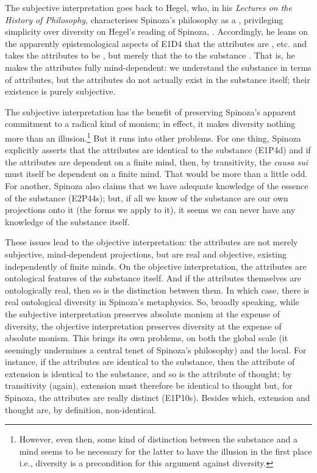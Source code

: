 \documentclass[11pt]{article}
\newcommand{\dash}{\unskip{---}}
\newcommand\foreign[2]{\foreignlanguage{#1}{\emph{#2}}}
\newcommand\texttitle[1]{\emph{#1}}
\newcommand\simplecite[1]{(#1)}
\begin{document}
	The subjective interpretation goes back to Hegel, who, in his \texttitle{Lectures on the History of Philosophy}, characterises Spinoza’s philosophy as a , privileging simplicity over diversity \dash on Hegel’s reading of Spinoza, . Accordingly, he leans on the apparently epistemological aspects of E1D4 \dash that the attributes are , etc. \dash and takes the attributes to be , but merely  that the   to the substance \autocite[159]{Hegel1990}. That is, he makes the attributes fully mind-dependent: we understand the substance in terms of attributes, but the attributes do not actually exist in the substance itself; their existence is purely subjective.
	
	The subjective interpretation has the benefit of preserving Spinoza’s apparent commitment to a radical kind of monism; in effect, it makes diversity nothing more than an illusion.\footnote{However, even then, some kind of distinction between the substance and a mind seems to be necessary for the latter to have the illusion in the first place \dash i.e., diversity is a precondition for this argument against diversity.} But it runs into other problems. For one thing, Spinoza explicitly asserts that the attributes are identical to the substance \simplecite{E1P4d} \dash and if the attributes are dependent on a finite mind, then, by transitivity, the \foreign{latin}{causa sui} must itself be dependent on a finite mind. That would be more than a little odd. For another, Spinoza also claims that we have adequate knowledge of the essence of the substance \simplecite{E2P44s}; but, if all we know of the substance are our own projections onto it (the forms we apply to it), it seems we can never have any knowledge of the substance itself.
	
	These issues lead to the objective interpretation: the attributes are not merely subjective, mind-dependent projections, but are real and objective, existing independently of finite minds. On the objective interpretation, the attributes are ontological features of the substance itself. And if the attributes themselves are ontologically real, then so is the distinction between them. In which case, there is real ontological diversity in Spinoza’s metaphysics. So, broadly speaking, while the subjective interpretation preserves absolute monism at the expense of diversity, the objective interpretation preserves diversity at the expense of absolute monism. This brings its own problems, on both the global scale (it seemingly undermines a central tenet of Spinoza’s philosophy) and the local. For instance, if the attributes are identical to the substance, then the attribute of extension is identical to the substance, and so is the attribute of thought; by transitivity (again), extension must therefore be identical to thought \dash but, for Spinoza, the attributes are really distinct (E1P10s). Besides which, extension and thought are, by definition, non-identical.
	
\end{document}
